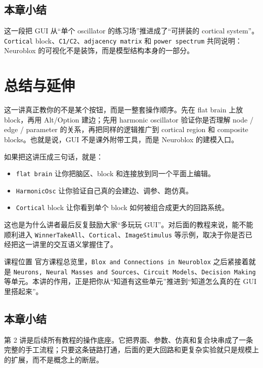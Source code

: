 \documentclass[a4paper]{article}
\begin{document}
\subsection{本章小结}
这一段把 GUI 从“单个 oscillator 的练习场”推进成了“可拼装的 cortical system”。\texttt{Cortical} block、\texttt{C1/C2}、\texttt{adjacency matrix} 和 \texttt{power spectrum} 共同说明：Neuroblox 的可视化不是装饰，而是模型结构本身的一部分。

\section{总结与延伸}
这一讲真正教你的不是某个按钮，而是一整套操作顺序。先在 flat brain 上放 block，再用 Alt/Option 建边；先用 harmonic oscillator 验证你是否理解 node / edge / parameter 的关系，再把同样的逻辑推广到 cortical region 和 composite blocks。也就是说，GUI 不是课外附带工具，而是 Neuroblox 的建模入口。

如果把这讲压成三句话，就是：
\begin{itemize}
  \item \texttt{flat brain} 让你把脑区、block 和连接放到同一个平面上编辑。
  \item \texttt{HarmonicOsc} 让你验证自己真的会建边、调参、跑仿真。
  \item \texttt{Cortical} block 让你看到单个 block 如何被组合成更大的回路系统。
\end{itemize}

这也是为什么讲者最后反复鼓励大家“多玩玩 GUI”。对后面的教程来说，能不能顺利进入 \texttt{WinnerTakeAll}、\texttt{Cortical}、\texttt{ImageStimulus} 等示例，取决于你是否已经把这一讲里的交互语义掌握住了。

\begin{importantbox}{课程位置}
官方课程总览里，\texttt{Blox and Connections in Neuroblox} 之后紧接着就是 \texttt{Neurons, Neural Masses and Sources}、\texttt{Circuit Models}、\texttt{Decision Making} 等单元。本讲的作用，正是把你从“知道有这些单元”推进到“知道怎么真的在 GUI 里搭起来”。
\end{importantbox}

\subsection{本章小结}
第 2 讲是后续所有教程的操作底座。它把界面、参数、仿真和复合块串成了一条完整的手工流程；只要这条链路打通，后面的更大回路和更复杂实验就只是规模上的扩展，而不是概念上的断层。
\end{document}
